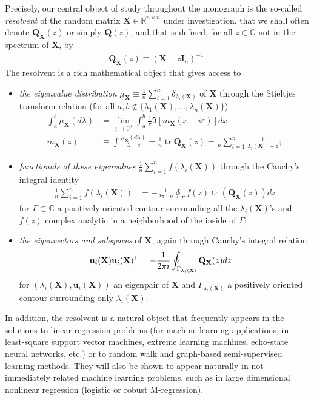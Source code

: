 \documentclass[MAL,biber]{nowfnt} %
\newcommand{\T}{{\sf T}}
\DeclareMathOperator{\tr}{tr}
\newcommand{\I}{{\mathbf{I}}}
\newcommand{\Q}{{\mathbf{Q}}}
\newcommand{\X}{{\mathbf{X}}}
\newcommand{\uu}{{\mathbf{u}}}
\newcommand{\CC}{{\mathbb{C}}}
\begin{document}
Precisely, our central object of study throughout the monograph is the so-called \emph{resolvent} of the random matrix $\X\in\mathbb{R}^{n\times n}$ under investigation, that we shall often denote $\Q_\X(z)$ or simply $\Q(z)$, and that is defined, for all $z\in\CC$ not in the spectrum of $\X$, by
\begin{align*}
    \Q_\X(z) \equiv \left( \X - z\I_n \right)^{-1}.
\end{align*}
The resolvent is a rich mathematical object that gives access to 
\begin{itemize}
    \item \emph{the eigenvalue distribution} $\mu_\X\equiv \frac1n\sum_{i=1}^n\delta_{\lambda_i(\X)}$ of $\X$ through the Stieltjes transform relation (for all $a,b\notin \{\lambda_1(\X),\ldots,\lambda_n(\X)\}$)
\begin{align*}
    \int_a^b \mu_\X(d\lambda) &= \lim_{\varepsilon\to 0^+} \int_a^b \frac1\pi \Im[m_\X(x+i\varepsilon)]dx \\
    m_\X(z) &\equiv \int \frac{\mu_\X(d\lambda)}{\lambda-z} = \frac1n\tr\Q_\X(z)=\frac1n\sum_{i=1}^n\frac1{\lambda_i(\X)-z};
\end{align*}
    \item \emph{functionals of these eigenvalues} $\frac1n\sum_{i=1}^nf(\lambda_i(\X))$ through the Cauchy's integral identity 
    \begin{align*}
        \frac1n\sum_{i=1}^nf(\lambda_i(\X)) &= -\frac1{2\pi\imath n}\oint_{\Gamma} f(z)\tr(\Q_\X(z))dz
    \end{align*}
    for $\Gamma\subset \CC$ a positively oriented contour surrounding all the $\lambda_i(\X)$'s and $f(z)$ complex analytic in a neighborhood of the inside of $\Gamma$;
    \item \emph{the eigenvectors and subspaces} of $\X$, again through Cauchy's integral relation
    \begin{align*}
        \uu_i(\X)\uu_i(\X)^\T &= -\frac1{2\pi\imath}\oint_{\Gamma_{\lambda_i(\X)}} \Q_\X(z)dz
    \end{align*}
    for $(\lambda_i(\X),\uu_i(\X))$ an eigenpair of $\X$ and $\Gamma_{\lambda_i(\X)}$ a positively oriented contour surrounding only $\lambda_i(\X)$.
\end{itemize}
In addition, the resolvent is a natural object that frequently appears in the solutions to linear regression problems (for machine learning applications, in least-square support vector machines, extreme learning machines, echo-state neural networks, etc.) or to random walk and graph-based semi-supervised learning methods. They will also be shown to appear naturally in not immediately related machine learning problems, such as in large dimensional nonlinear regression (logistic or robust M-regression).
\end{document}
